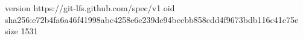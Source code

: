 version https://git-lfs.github.com/spec/v1
oid sha256:e72b4fa6a46f41998abc4258e6e239de94bcebb858cdd4f9673bdb116c41c75e
size 1531
